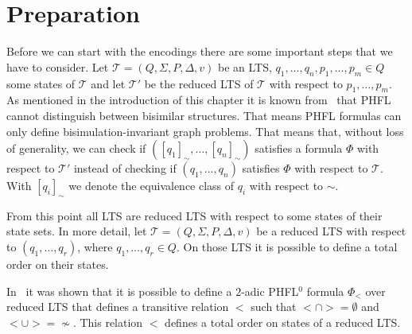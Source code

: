 \section{Preparation}\label{sec:lower_bounds_preparation}

Before we can start with the encodings there are some important steps that we have to consider.  Let $\mathcal{T} = (Q, 
\Sigma, P, \Delta, v)$ be an LTS, $q_1, \dots, q_n, p_1, \dots, p_m \in Q$ some states of $\mathcal{T}$ and let $\mathcal{T}'$ be the 
reduced LTS of $\mathcal{T}$ with respect to $p_1, \dots, p_m$.  
As mentioned in the introduction of this chapter it is known from~\cite{lange2014capturing} that PHFL cannot distinguish 
between bisimilar structures. That means PHFL formulas can only define bisimulation-invariant graph problems. That means that, without loss of generality, we can check if $([q_1]_\sim, \dots, [q_n]_\sim)$ satisfies a formula $\Phi$ with respect to $\mathcal{T}'$ instead of checking if $(q_1, \dots, q_n)$ satisfies 
$\Phi$ with respect to $\mathcal{T}$. With $[q_i]_\sim$ we denote the equivalence class of $q_i$ with respect to $\sim$.

From this point all LTS are reduced LTS with respect to some states of their state sets. In more detail, let $\mathcal{T} = (Q, \Sigma, P, \Delta, v)$ be a reduced LTS with respect to $(q_1, \dots, q_r)$, where $q_1, \dots, q_r \in Q$. On those LTS it is possible to define a total order on their states. 

\begin{remark} \label{remark:transitive_relation}
    In~\cite{otto1999bisimulation} it was shown that it is possible to define a $2$-adic PHFL$^0$ formula $\Phi_<$ over reduced LTS that defines a
    transitive relation $<$ such that $< \cap > = \emptyset$ and $< \cup > = \not\sim$. This relation $<$ defines a total
    order on states of a reduced LTS.
\end{remark}